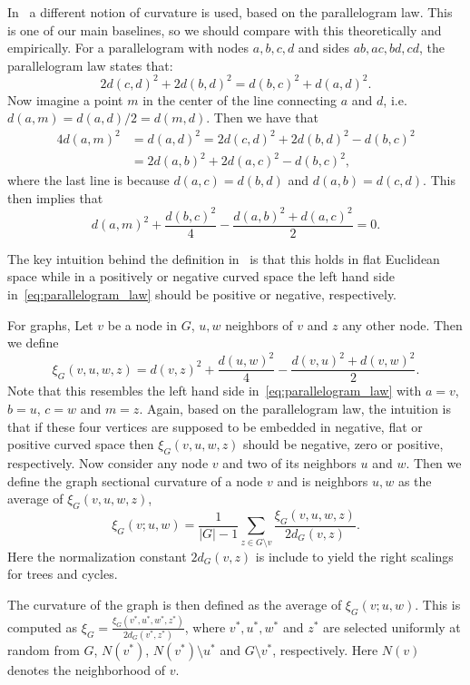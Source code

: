 \documentclass{article}
\begin{document}
In~\cite{gu2019learning} a different notion of curvature is used, based on the parallelogram law. This is one of our main baselines, so we should compare with this theoretically and empirically. For a parallelogram with nodes $a,b,c,d$ and sides $ab, ac, bd, cd$, the parallelogram law states that:
\[
	2d(c,d)^2 + 2d(b,d)^2 = d(b,c)^2 + d(a,d)^2.
\]
Now imagine a point $m$ in the center of the line connecting $a$ and $d$, i.e. $d(a,m)=d(a,d)/2=d(m,d)$. Then we have that
\begin{align*}
	4d(a,m)^2 &= d(a,d)^2 = 2d(c,d)^2 + 2d(b,d)^2 - d(b,c)^2 \\
	&= 2d(a,b)^2 + 2d(a,c)^2 - d(b,c)^2,
\end{align*}
where the last line is because $d(a,c) = d(b,d)$ and $d(a,b) = d(c,d)$. This then implies that
\begin{equation}\label{eq:parallelogram_law}
	d(a,m)^2 + \frac{d(b,c)^2}{4} - \frac{d(a,b)^2 + d(a,c)^2}{2} = 0.
\end{equation}

The key intuition behind the definition in~\cite{gu2019learning} is that this holds in flat Euclidean space while in a positively or negative curved space the left hand side in~\eqref{eq:parallelogram_law} should be positive or negative, respectively. 

For graphs, Let $v$ be a node in $G$, $u,w$ neighbors of $v$ and $z$ any other node. Then we define
\begin{equation}
	\xi_G(v,u,w,z) = d(v,z)^2 + \frac{d(u,w)^2}{4} - \frac{d(v,u)^2 + d(v,w)^2}{2}.
\end{equation}
Note that this resembles the left hand side in~\eqref{eq:parallelogram_law} with $a = v$, $b = u$, $c = w$ and $m = z$. Again, based on the parallelogram law, the intuition is that if these four vertices are supposed to be embedded in negative, flat or positive curved space then $\xi_G(v,u,w,z)$ should be negative, zero or positive, respectively. Now consider any node $v$ and two of its neighbors $u$ and $w$. Then we define the graph sectional curvature of a node $v$ and is neighbors $u,w$ as the average of $\xi_G(v,u,w,z)$,
\[
	\xi_G(v; u,w) = \frac{1}{|G|-1} \sum_{z \in G\setminus v} \frac{\xi_G(v,u,w,z)}{2d_G(v,z)}.
\] 
Here the normalization constant $2d_G(v,z)$ is include to yield the right scalings for trees and cycles.

The curvature of the graph is then defined as the average of $\xi_G(v; u,w)$. This is computed as $\xi_G = \frac{\xi_G(v^\ast,u^\ast,w^\ast,z^\ast)}{2d_G(v^\ast,z^\ast)}$, where $v^\ast, u^\ast, w^\ast$ and $z^\ast$ are selected uniformly at random from $G$, $N(v^\ast)$, $N(v^\ast)\setminus u^\ast$ and $G\setminus v^\ast$, respectively. Here $N(v)$ denotes the neighborhood of $v$.
\end{document}
